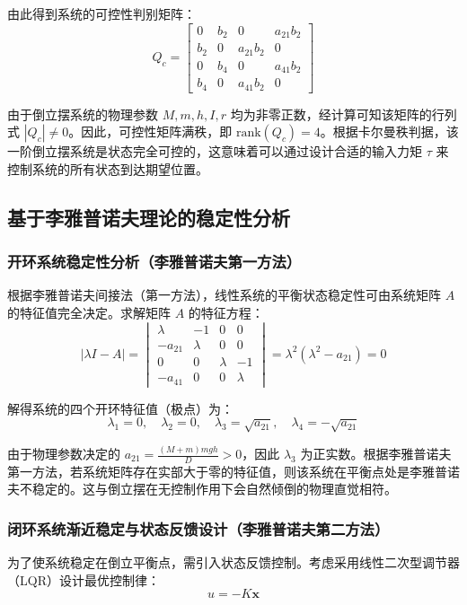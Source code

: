 \documentclass[
  oneside,
  degree=bachelor,
  fullwidthstop=false,
  fontset=fandol,
  times=false,
  minted=true,
  biblatex=true,
]{tongjithesis}
\begin{document}
由此得到系统的可控性判别矩阵：
\begin{equation}
Q_c = \begin{bmatrix} 0 & b_2 & 0 & a_{21}b_2 \\ b_2 & 0 & a_{21}b_2 & 0 \\ 0 & b_4 & 0 & a_{41}b_2 \\ b_4 & 0 & a_{41}b_2 & 0 \end{bmatrix}
\end{equation}

由于倒立摆系统的物理参数 $M, m, h, I, r$ 均为非零正数，经计算可知该矩阵的行列式 $|Q_c| \neq 0$。因此，可控性矩阵满秩，即 $\text{rank}(Q_c) = 4$。根据卡尔曼秩判据，该一阶倒立摆系统是状态完全可控的，这意味着可以通过设计合适的输入力矩 $\tau$ 来控制系统的所有状态到达期望位置。

\subsection{基于李雅普诺夫理论的稳定性分析}
\subsubsection{开环系统稳定性分析（李雅普诺夫第一方法）}

根据李雅普诺夫间接法（第一方法），线性系统的平衡状态稳定性可由系统矩阵 $A$ 的特征值完全决定。求解矩阵 $A$ 的特征方程：
\begin{equation}
|\lambda I - A| = \begin{vmatrix} \lambda & -1 & 0 & 0 \\ -a_{21} & \lambda & 0 & 0 \\ 0 & 0 & \lambda & -1 \\ -a_{41} & 0 & 0 & \lambda \end{vmatrix} = \lambda^2 (\lambda^2 - a_{21}) = 0
\end{equation}

解得系统的四个开环特征值（极点）为：
\begin{equation}
\lambda_1 = 0, \quad \lambda_2 = 0, \quad \lambda_3 = \sqrt{a_{21}}, \quad \lambda_4 = -\sqrt{a_{21}}
\end{equation}

由于物理参数决定的 $a_{21} = \frac{(M+m)mgh}{D} > 0$，因此 $\lambda_3$ 为正实数。根据李雅普诺夫第一方法，若系统矩阵存在实部大于零的特征值，则该系统在平衡点处是李雅普诺夫不稳定的。这与倒立摆在无控制作用下会自然倾倒的物理直觉相符。

\subsubsection{闭环系统渐近稳定与状态反馈设计（李雅普诺夫第二方法）}
为了使系统稳定在倒立平衡点，需引入状态反馈控制。考虑采用线性二次型调节器（LQR）设计最优控制律：
\begin{equation}
u = -K\mathbf{x}
\end{equation}
\end{document}

